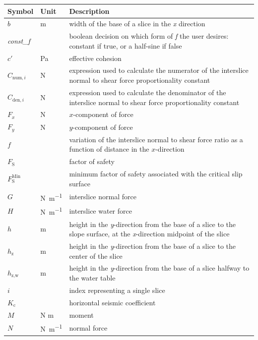 \documentclass[12pt]{article}
\renewcommand{\arraystretch}{1}
\begin{document}
\renewcommand{\arraystretch}{1.6}
\setlength{\tabcolsep}{20pt}
\begin{longtable*}{  l  l  p{8.5cm}  }
\hline
\textbf{Symbol} & \textbf{Unit} & \textbf{Description} \\
\hline
$b$ & \si{\meter}& width of the base of a slice in the \textit{x} direction
\\
\textit{const\_f} & & boolean decision on which form of \textit{f} 
the user desires: constant if true, or a half-sine if false
\\
$c'$ & \si{\pascal} & effective cohesion 
\\
${C_{\text{num},i}}$ & \si{\newton}& expression used to calculate the numerator 
of the interslice normal to shear force proportionality constant
\\
${C_{\text{den},i}}$ & \si{\newton}& expression used to calculate the 
denominator of the interslice normal to shear force proportionality constant
\\
${F_{x}}$ & \si{\newton} & $x$-component of force
\\
${F_{y}}$ & \si{\newton} & $y$-component of force
\\
$f$ & & variation of the interslice normal to shear force ratio as a function 
of distance in the $x$-direction
\\
$F_\text{S}$ & & factor of safety
\\
$F_\text{S}^{\text{Min}}$ & & minimum factor of safety associated with the 
critical slip surface
\\
$G$ & \si{\newton\per\meter} & interslice normal force
\\
$H$ & \si{\newton\per\meter} & interslice water force
\\
$h$ &  \si{\meter}& height in the \textit{y}-direction from the base of a slice 
to the slope surface, at the \textit{x}-direction midpoint of the slice
\\
$h_{\text{z}}$ & \si{\meter}& height in the \textit{y}-direction from the base 
of a slice to the center of the slice
\\
$h_\text{z,w}$ & \si{\meter}& height in the \textit{y}-direction from the base 
of a slice halfway to the water table
\\ 
$i$ & & index representing a single slice 
\\
${K_{\text{c}}}$ & & horizontal seismic coefficient
\\
$M$ & N \si{\meter}& moment
\\
$N$ & \si{\newton\per\meter} & normal force
\\

\end{longtable*}
\end{document}
